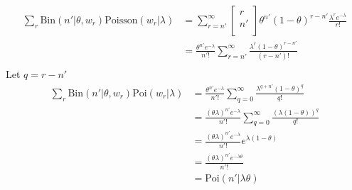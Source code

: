 \begin{equation}
	\begin{split}
		\sum_r\text{Bin}(n'|\theta,w_r)\text{Poisson}(w_r|\lambda) &= \sum_{r=n'}^\infty \begin{bmatrix}
			r \\
			n' \\
		\end{bmatrix}
		\theta^{n'}(1-\theta)^{r-n'}\frac{\lambda^re^{-\lambda}}{r!}\\
		&=\frac{\theta^{n'}e^{-\lambda}}{n'!}\sum_{r=n'}^{\infty} \frac{\lambda^r	(1-\theta)^{r-n'}}{(r-n')!}\\
	\end{split}
\end{equation}
Let $q= r-n'$
\begin{equation}
	\begin{split}
		\sum_r\text{Bin}(n'|\theta,w_r)\text{Poi}(w_r|\lambda) &=\frac{\theta^{n'}e^{-\lambda}}{n'!}\sum_{q=0}^{\infty} \frac{\lambda^{q+n'}(1-\theta)^{q}}{q!}\\
		&=\frac{(\theta\lambda)^{n'}e^{-\lambda}}{n'!}\sum_{q=0}^{\infty} \frac{(\lambda(1-\theta))^{q}}{q!}\\
		&=\frac{(\theta\lambda)^{n'}e^{-\lambda}}{n'!}e^{\lambda(1-\theta)}\\
		&=\frac{(\theta\lambda)^{n'}e^{-\lambda\theta}}{n'!}\\
		&= \text{Poi}(n'|\lambda\theta)
	\end{split}
\end{equation}

